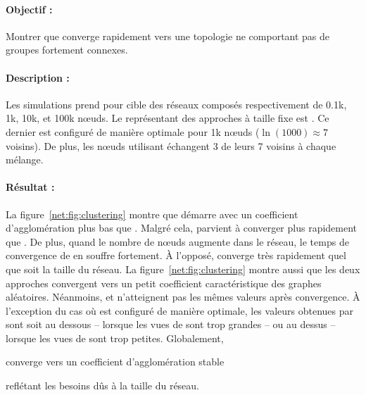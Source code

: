 \paragraph{Objectif :} Montrer que \SPRAY converge rapidement vers une topologie
ne comportant pas de groupes fortement connexes.

\paragraph{Description :} Les simulations prend pour cible des réseaux composés
respectivement de 0.1k, 1k, 10k, et 100k nœuds. Le représentant des approches à
taille fixe est \CYCLON. Ce dernier est configuré de manière optimale pour 1k
nœuds ($\ln(1000)\approx 7$ voisins). De plus, les nœuds utilisant \CYCLON
échangent 3 de leurs 7 voisins à chaque mélange.

\paragraph{Résultat :} La figure~\ref{net:fig:clustering} montre que \CYCLON
démarre avec un coefficient d'agglomération plus bas que \SPRAY. Malgré cela,
\SPRAY parvient à converger plus rapidement que \CYCLON. De plus, quand le
nombre de nœuds augmente dans le réseau, le temps de convergence de \CYCLON en
souffre fortement. À l'opposé, \SPRAY converge très rapidement quel que soit la
taille du réseau. La figure~\ref{net:fig:clustering} montre aussi que les deux
approches convergent vers un petit coefficient caractéristique des graphes
aléatoires. Néanmoins, \CYCLON et \SPRAY n'atteignent pas les mêmes valeurs
après convergence. À l'exception du cas où \CYCLON est configuré de manière
optimale, les valeurs obtenues par \SPRAY sont soit au dessous -- lorsque les
vues de \CYCLON sont trop grandes -- ou au dessus -- lorsque les vues de \CYCLON
sont trop petites. Globalement, \SPRAY
\begin{inparaenum}[(i)]
\item converge vers un coefficient d'agglomération stable
\item reflétant les besoins dûs à la taille du réseau.
\end{inparaenum}
